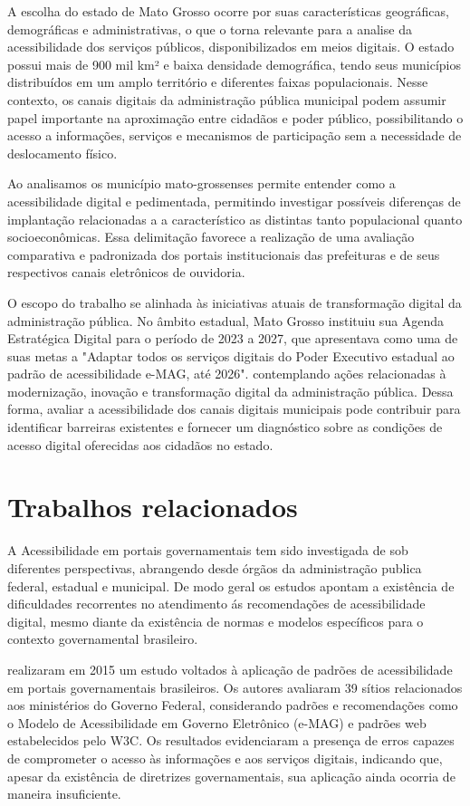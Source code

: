 \documentclass[12pt]{article}
\begin{document}
A escolha do estado de Mato Grosso ocorre por suas características geográficas, demográficas e administrativas, o que o torna relevante para a analise da acessibilidade dos serviços públicos, disponibilizados em meios digitais. O estado possui mais de 900 mil km² e baixa densidade demográfica, tendo seus municípios distribuídos em um  amplo território e diferentes faixas populacionais. Nesse contexto, os canais digitais da administração pública municipal podem assumir papel importante na aproximação entre cidadãos e poder público, possibilitando o acesso a informações, serviços e mecanismos de participação sem a necessidade de deslocamento físico.

Ao analisamos os município mato-grossenses permite entender como a acessibilidade digital e pedimentada, permitindo investigar possíveis diferenças de implantação relacionadas a a característico as distintas tanto populacional quanto socioeconômicas. Essa delimitação favorece a realização de uma avaliação comparativa e padronizada dos portais institucionais das prefeituras e de seus respectivos canais eletrônicos de ouvidoria.

O escopo do trabalho se alinhada às iniciativas atuais de transformação digital da administração pública. No âmbito estadual, Mato Grosso instituiu sua Agenda Estratégica Digital para o período de 2023 a 2027, que apresentava como uma de suas metas a "Adaptar todos os serviços digitais do Poder Executivo estadual ao padrão de acessibilidade e-MAG, até 2026". \cite{matogrosso:2023} contemplando ações relacionadas à modernização, inovação e transformação digital da administração pública. Dessa forma, avaliar a acessibilidade dos canais digitais municipais pode contribuir para identificar barreiras existentes e fornecer um diagnóstico sobre as condições de acesso digital oferecidas aos cidadãos no estado.


\section{Trabalhos relacionados}
A Acessibilidade em portais governamentais tem sido investigada de sob diferentes perspectivas, abrangendo desde órgãos da administração publica federal, estadual e municipal. De modo geral os estudos apontam a existência de dificuldades recorrentes no atendimento  ás recomendações de acessibilidade digital, mesmo diante da existência de normas e modelos específicos para o contexto governamental brasileiro. 

\cite{sbsi} realizaram em 2015 um estudo voltados à aplicação de padrões de acessibilidade em portais governamentais brasileiros. Os autores avaliaram 39 sítios relacionados aos ministérios do Governo Federal, considerando padrões e recomendações como o Modelo de Acessibilidade em Governo Eletrônico (e-MAG) e padrões web estabelecidos pelo W3C. Os resultados evidenciaram a presença de erros capazes de comprometer o acesso às informações e aos serviços digitais, indicando que, apesar da existência de diretrizes governamentais, sua aplicação ainda ocorria de maneira insuficiente.
\end{document}
